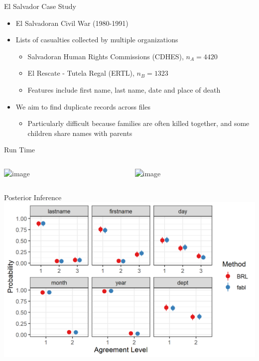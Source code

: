 \documentclass{beamer}
\begin{document}
\begin{frame}{El Salvador Case Study}
	\begin{itemize}
		\item El Salvadoran Civil War (1980-1991)
		\item Lists of casualties collected by multiple organizations
		\begin{itemize}
			\item Salvadoran Human Rights Commissions (CDHES), $n_A = 4420$
			\item El Rescate - Tutela Regal (ERTL), $n_B = 1323$
			\item Features include first name, last name, date and place of death
		\end{itemize}
		\item We aim to find duplicate records across files
		\begin{itemize}
			\item Particularly difficult because families are often killed together, and some children share names with parents
		\end{itemize}

	\end{itemize}
\end{frame}

\begin{frame}{Run Time}
		\begin{columns}
		\begin{column}{0.48\textwidth}
			\centering
			\includegraphics<1->[width = .6\textwidth, height = .6\textwidth ]{../notes/figures/el_salvador/time_table_big_P2.png}
			
		\end{column}
		\begin{column}{0.48\textwidth}
			\centering
			\includegraphics<2>[width = .6\textwidth, height = .6\textwidth ]{../notes/figures/el_salvador/time_table_small_P2.png}	
		\end{column}
	\end{columns}
\end{frame}

\begin{frame}{Posterior Inference}
	\includegraphics[width = \textwidth, height = .6\textwidth ]{../notes/figures/el_salvador/m_posterior_smallP.png}
\end{frame}
\end{document}

